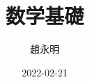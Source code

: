 \documentclass[dvipdfmx]{jbook}
\begin{document}
\title{数学基礎}
\author{趙永明}
\date{2022-02-21}
\maketitle
\newpage
\tableofcontents
{}
\newpage

\chapter{}
\end{document}
